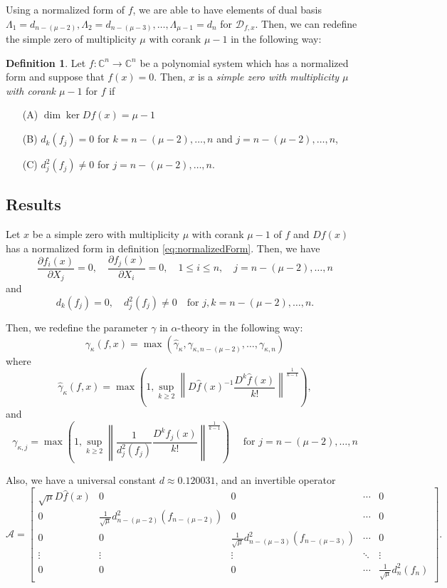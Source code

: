\documentclass[12pt,oneside,reqno]{amsart}
\theoremstyle{definition}
\newtheorem{defi}[thm]{Definition}
\begin{document}
Using a normalized form of $f$, we are able to have elements of dual basis $\Lambda_1=d_{n-(\mu-2)},\Lambda_2=d_{n-(\mu-3)},\dots,\Lambda_{\mu-1}=d_n$ for $\mathcal{D}_{f,x}$. Then, we can redefine the simple zero of multiplicity $\mu$ with corank $\mu-1$ in the following way:
\begin{defi}
 Let $f:\mathbb{C}^n\rightarrow\mathbb{C}^n$ be a polynomial system which has a normalized form and suppose that $f(x)=0$. Then, $x$ is a {\it simple zero with multiplicity $\mu$ with corank $\mu-1$} for $f$ if
 \begin{itemize}
 	\item[(A)] $\dim\ker Df(x)=\mu -1$
 	\item[(B)] $d_k(f_j)=0$ for $k=n-(\mu-2),\dots,n$ and $j=n-(\mu-2),\dots,n$,
 	\item[(C)] $d_{j}^2(f_{j})\ne0$ for $j=n-(\mu-2),\dots, n$.
 	\end{itemize}
	
\end{defi}


\subsection{Results}
Let $x$ be a simple zero with multiplicity $\mu$ with corank $\mu-1$ of $f$ and $Df(x)$ has a normalized form in definition \ref{eq:normalizedForm}. Then, we have 
\[\frac{\partial f_i(x)}{\partial X_j}=0,\quad \frac{\partial f_j(x)}{\partial X_i}=0, \quad 1\leq i\leq n,\quad j=n-(\mu-2),\dots,n\]
and
\[d_k(f_j)=0,\quad d_j^2(f_j)\ne 0\quad \text{for }j,k=n-(\mu-2),\dots,n.\]

Then, we redefine the parameter $\gamma$ in $\alpha$-theory in the following way:
$$\gamma_{\kappa}(f,x)=\max(\hat{\gamma}_{\kappa},\gamma_{\kappa,n-(\mu -2)},\dots,\gamma_{\kappa,n})$$
where
\[\hat{\gamma}_{\kappa}(f,x)=\max\left(1,\sup\limits_{k\geq 2}\left\|D\hat{f}(x)^{-1}\frac{D^k\hat{f}(x)}{k!}\right\|^{\frac{1}{k-1}}\right),\]
and
\[\gamma_{\kappa,j}=\max\left(1,\sup\limits_{k\geq 2}\left\|\frac{1}{d_j^2(f_j)}\frac{D^k f_j(x)}{k!}\right\|^{\frac{1}{k-1}}\right)\quad \text{ for } j=n-(\mu-2),\dots,n\]


Also, we have a universal constant $d\approx 0.120031$, and an invertible operator 
\[\mathcal{A}=\begin{bmatrix}
\sqrt{\mu}D\hat{f}(x) & 0 & 0 & \cdots & 0\\
0 & \frac{1}{\sqrt{\mu}}d_{n-(\mu-2)}^2(f_{n-(\mu-2)}) &0 & \cdots & 0 \\
0 & 0 & \frac{1}{\sqrt{\mu}}d_{n-(\mu-3)}^2(f_{n-(\mu-3)}) & \cdots & 0 \\
\vdots & \vdots & \vdots & \ddots & \vdots \\
0 & 0 & 0 & \cdots &\frac{1}{\sqrt{\mu}}d_{n}^2(f_{n})
\end{bmatrix}.\]
\end{document}

